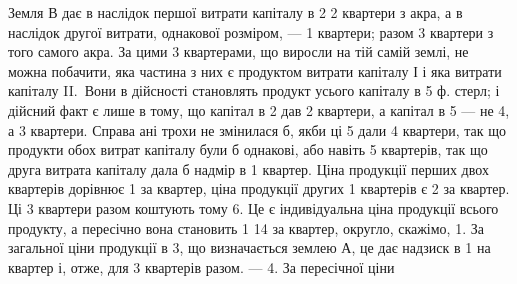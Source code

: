 
Земля $В$ дає в наслідок першої витрати капіталу в 2 2 квартери
з акра, а в наслідок другої витрати, однакової розміром, — 1 квартери; разом
3 квартери з того самого акра. За цими 3 квартерами, що виросли
на тій самій землі, не можна побачити, яка частина з них є продуктом витрати
капіталу І і яка витрати капіталу II.~Вони в дійсності становлять продукт
усього капіталу в 5 ф. стерл; і дійсний факт є лише в тому, що капітал
в 2 дав 2 квартери, а капітал в 5 — не 4, а 3 квартери.
Справа ані трохи не змінилася б, якби ці 5 дали 4 квартери, так що
продукти обох витрат капіталу були б однакові, або навіть 5 квартерів, так
що друга витрата капіталу дала б надмір в 1 квартер. Ціна продукції перших
двох квартерів дорівнює 1 за квартер, ціна продукції других 1 квартерів є 2 за квартер. Ці 3 квартери разом коштують тому 6.
Це є індивідуальна ціна продукції всього продукту, а пересічно вона становить
1 14 за квартер, округло, скажімо, 1. За загальної ціни
продукції в 3, що визначається землею $А$, це дає надзиск в 1
на квартер і, отже, для 3 квартерів разом. — 4. За пересічної ціни
\parbreak{}  %
